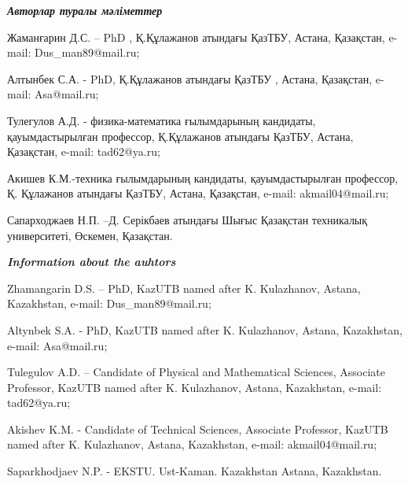 \emph{{\bfseries Авторлар туралы мәліметтер}}
\begin{noparindent}

Жаманғарин Д.С. -- PhD , Қ.Құлажанов атындағы ҚазТБУ, Астана, Қазақстан,
e-mail: Dus\_man89@mail.ru;

Алтынбек С.А. - PhD, Қ.Құлажанов атындағы ҚазТБУ , Астана, Қазақстан,
e-mail: Asa@mail.ru;

Тулегулов А.Д. - физика-математика ғылымдарының кандидаты,
қауымдастырылған профессор, Қ.Құлажанов атындағы ҚазТБУ, Астана,
Қазақстан, e-mail: tad62@ya.ru;

Акишев К.М.-техника ғылымдарының кандидаты, қауымдастырылған профессор,
Қ. Құлажанов атындағы ҚазТБУ, Астана, Қазақстан, e-mail:
akmail04@mail.ru;

Сапарходжаев Н.П. --Д. Серікбаев атындағы Шығыс Қазақстан техникалық
университеті, Өскемен, Қазақстан.
\end{noparindent}

\emph{{\bfseries Information about the auhtors}}
\begin{noparindent}

Zhamangarin D.S. -- PhD, KazUTB named after K. Kulazhanov, Astana,
Kazakhstan, e-mail: Dus\_man89@mail.ru;

Altynbek S.A. - PhD, KazUTB named after K. Kulazhanov, Astana,
Kazakhstan, e-mail: Asa@mail.ru;

Tulegulov A.D. -- Candidate of Physical and Mathematical Sciences,
Associate Professor, KazUTB named after K. Kulazhanov, Astana,
Kazakhstan, e-mail: tad62@ya.ru;

Akishev K.M. - Candidate of Technical Sciences, Associate Professor,
KazUTB named after K. Kulazhanov, Astana, Kazakhstan, e-mail:
akmail04@mail.ru;

Saparkhodjaev N.P. - EKSTU. Ust-Kaman. Kazakhstan Astana, Kazakhstan.
\end{noparindent}


